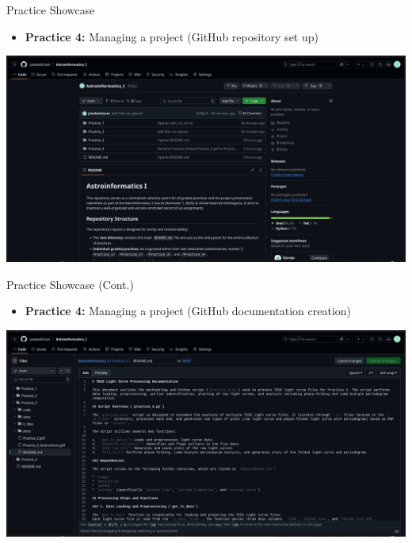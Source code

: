 \documentclass[12pt, aspectratio=169]{beamer}
\begin{document}
  \begin{frame}[t]{Practice Showcase}
    \begin{itemize}
      \item \textbf{Practice 4:} Managing a project (GitHub repository set up)
    \end{itemize}
    \centering
    \includegraphics[width=1.5\textheight]{figures/4-1.png}
  \end{frame}

  \begin{frame}[t]{Practice Showcase (Cont.)}
    \begin{itemize}
      \item \textbf{Practice 4:} Managing a project (GitHub documentation creation)
    \end{itemize}
    \centering
    \includegraphics[width=1.5\textheight]{figures/4-2.png}
  \end{frame}
\end{document}
